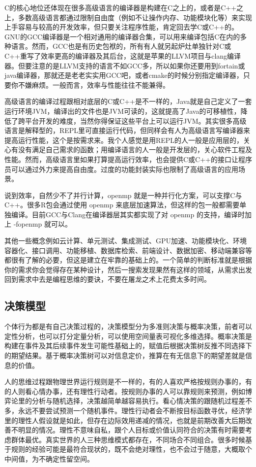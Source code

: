 \documentclass[]{tufte-book}
\begin{document}
C的核心地位还体现在很多高级语言的编译器是构建在C之上的，或者是C++之上，多数高级语言都通过限制自由度（例如不让操作内存、功能模块化等）来实现上手容易与较高的开发效率，但只要关注程序性能，肯定回去学C或C++的。GNU的GCC编译器是一个相对通用的编译器合集，可以用来编译包括C在内的多种语言。然而，GCC也是有历史包袱的，所有有人就另起炉灶单独针对C或C++重写了效率更高的编译器及其后台，这就是苹果的LLVM项目与clang编译器。但要注意的是LLVM支持的语言不如GCC多，所以如果你还要用到fortain或java编译器，那就还是老老实实用GCC吧，或者cmake的时候分别指定编译器，只要你不嫌麻烦。一般而言，效率与性能往往不能兼得。

高级语言的编译过程跟相对底层的C或C++是不一样的，Java就是自己定义了一套运行环境JVM，编译出的文件也是JVM可读的，这就提高了Java的可移植性，降低了跨平台开发的难度，当然你得保证这些平台上可以运行JVM。其实很多高级语言是解释型的，REPL里可直接运行代码，但同样会有人为高级语言写编译器来提高运行性能，这个是按需求来。我个人感觉是用REPL的人一般是应用层的，关心有没有满足自己需求的函数；用编译语言的人一般是开发层的，关心软件工程及性能。然而，高级语言里如果打算提高运行效率，也会提供C或C++的接口让程序员可以通过外力来提高自由度。过度的功能封装实际也限制了高级语言的应用场景。

说到效率，自然少不了并行计算，openmp 就是一种并行化方案，可以支撑C与C++。很多R包会通过使用 openmp 来底层加速算法，但这样的包一般都需要单独编译。目前GCC与Clang在编译器层其实都实现了对 openmp 的支持，编译时加上 -fopenmp 就可以。

其他一些概念例如云计算、单元测试、集成测试、GPU加速、功能模块化、环境容器化、接口调用、功能移植、数据库检索、前端设计、数据加密、移动端兼容等都很有了解的必要，但这是建立在牢靠的基础上的。一个简单的判断标准就是根据你的需求你会觉得存在某种设计，然后一搜索发现果然有这样的领域，从需求出发回到需求中去是编程思维的要诀，不要在屠龙之术上花费太多时间。

\hypertarget{ux51b3ux7b56ux6a21ux578b}{%
\subsection{决策模型}\label{ux51b3ux7b56ux6a21ux578b}}

个体行为都是有自己决策过程的，决策模型分为多准则决策与概率决策，前者可以定性分析，也可以打分定量分析，可以使用空间量表可视化多维选择。概率决策是构建在事件及其后续事件发生可能性基础上的，赋值后根据决策树反推不同选择下的期望结果。基于概率决策树可以对信息定价，推算在有无信息下的期望差就是信息的价值。

人的思维过程跟物理世界运行规则是不一样的，有的人喜欢严格按规则办事的，有的人则看心情办事，还有理性行动者。按规则办事的人可以靠规则来预测，例如博弈论里的分析与随机选择，决策越简单越容易执行。看心情决策的跟随机过程差不多，永远不要尝试预测一个随机事件。理性行动者会不断按目标函数寻优，经济学里的理性人假设就是如此，但存在边际效用递减的情况，也就是前期改善大后期改善不明显的情况。理性不意味自私，跟个人目标或价值认同符合的决策有时需要考虑群体最优。真实世界的人三种思维模式都存在，不同场合不同组合。很多时候基于规则的经验可能是最符合现状的，既不会绝对理性，也不会过于随意，大概取个中间值，为不确定性留空间。
\end{document}
